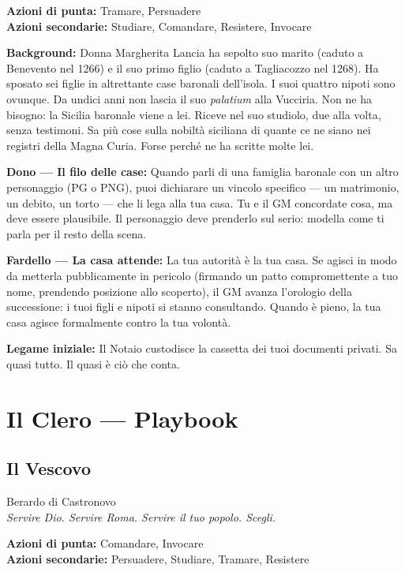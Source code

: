 \textbf{Azioni di punta:} Tramare, Persuadere\\
\textbf{Azioni secondarie:} Studiare, Comandare, Resistere, Invocare

\textbf{Background:} Donna Margherita Lancia ha sepolto suo
marito (caduto a Benevento nel 1266) e il suo primo figlio
(caduto a Tagliacozzo nel 1268). Ha sposato sei figlie in
altrettante case baronali dell'isola. I suoi quattro nipoti
sono ovunque. Da undici anni non lascia il suo \textit{palatium}
alla Vucciria. Non ne ha bisogno: la Sicilia baronale viene a
lei. Riceve nel suo studiolo, due alla volta, senza testimoni.
Sa più cose sulla nobiltà siciliana di quante ce ne siano nei
registri della Magna Curia. Forse perché ne ha scritte molte lei.

\textbf{Dono — Il filo delle case:} Quando parli di una famiglia
baronale con un altro personaggio (PG o PNG), puoi dichiarare
un vincolo specifico — un matrimonio, un debito, un torto — che
li lega alla tua casa. Tu e il GM concordate cosa, ma deve
essere plausibile. Il personaggio deve prenderlo sul serio:
modella come ti parla per il resto della scena.

\textbf{Fardello — La casa attende:} La tua autorità è la tua
casa. Se agisci in modo da metterla pubblicamente in pericolo
(firmando un patto compromettente a tuo nome, prendendo posizione
allo scoperto), il GM avanza l'orologio della successione: i
tuoi figli e nipoti si stanno consultando. Quando è pieno, la
tua casa agisce formalmente contro la tua volontà.

\textbf{Legame iniziale:} Il Notaio custodisce la cassetta dei
tuoi documenti privati. Sa quasi tutto. Il quasi è ciò che conta.

\secsep

\section{Il Clero — Playbook}

\subsection{Il Vescovo}
{\cinzel\footnotesize\color{grigionote} Berardo di Castronovo}\\
\textit{Servire Dio. Servire Roma. Servire il tuo popolo. Scegli.}

\textbf{Azioni di punta:} Comandare, Invocare\\
\textbf{Azioni secondarie:} Persuadere, Studiare, Tramare, Resistere

